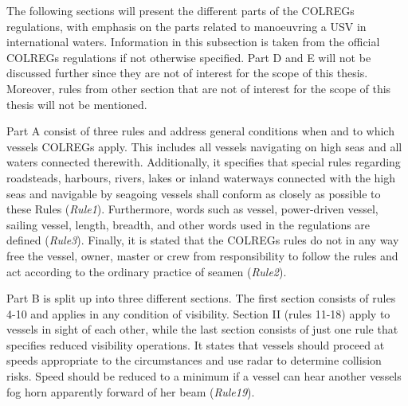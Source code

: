 The following sections will present the different parts of the COLREGs regulations, with emphasis on the parts related to manoeuvring a USV in international waters. Information in this subsection is taken from the official COLREGs regulations  \cite{colreg} if not otherwise specified. Part D and E will not be discussed further since they are not of interest for the scope of this thesis. Moreover, rules from other section that are not of interest for the scope of this thesis will not be mentioned.

Part A consist of three rules and address general conditions when and to which vessels COLREGs apply. This includes all vessels navigating on high seas and all waters connected therewith. Additionally, it specifies that special rules regarding roadsteads, harbours, rivers, lakes or inland waterways connected with the high seas and navigable by seagoing vessels shall conform as closely as possible to these Rules (\textit{Rule1}). Furthermore, words such as vessel, power-driven vessel, sailing vessel, length, breadth, and other words used in the regulations are defined (\textit{Rule3}). Finally, it is stated that the COLREGs rules do not in any way free the vessel, owner, master or crew from responsibility to follow the rules and act according to the ordinary practice of seamen (\textit{Rule2}).

Part B is split up into three different sections. The first section consists of rules 4-10 and applies in any condition of visibility. Section II (rules 11-18) apply to vessels in sight of each other, while the last section consists of just one rule that specifies reduced visibility operations. It states that vessels should proceed at speeds appropriate to the circumstances and use radar to determine collision risks. Speed should be reduced to a minimum if a vessel can hear another vessels fog horn apparently forward of her beam (\textit{Rule19}).

